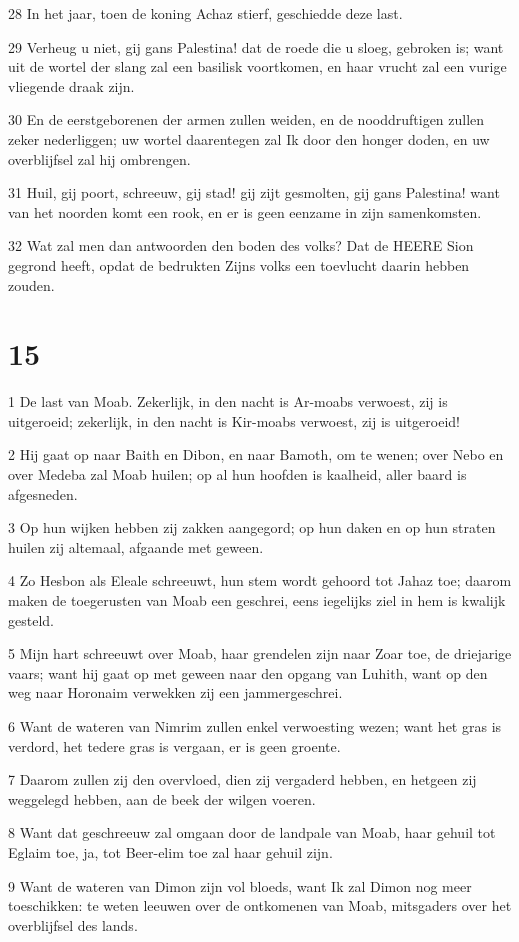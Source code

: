 \par 28 In het jaar, toen de koning Achaz stierf, geschiedde deze last.
\par 29 Verheug u niet, gij gans Palestina! dat de roede die u sloeg, gebroken is; want uit de wortel der slang zal een basilisk voortkomen, en haar vrucht zal een vurige vliegende draak zijn.
\par 30 En de eerstgeborenen der armen zullen weiden, en de nooddruftigen zullen zeker nederliggen; uw wortel daarentegen zal Ik door den honger doden, en uw overblijfsel zal hij ombrengen.
\par 31 Huil, gij poort, schreeuw, gij stad! gij zijt gesmolten, gij gans Palestina! want van het noorden komt een rook, en er is geen eenzame in zijn samenkomsten.
\par 32 Wat zal men dan antwoorden den boden des volks? Dat de HEERE Sion gegrond heeft, opdat de bedrukten Zijns volks een toevlucht daarin hebben zouden.

\chapter{15}

\par 1 De last van Moab. Zekerlijk, in den nacht is Ar-moabs verwoest, zij is uitgeroeid; zekerlijk, in den nacht is Kir-moabs verwoest, zij is uitgeroeid!
\par 2 Hij gaat op naar Baith en Dibon, en naar Bamoth, om te wenen; over Nebo en over Medeba zal Moab huilen; op al hun hoofden is kaalheid, aller baard is afgesneden.
\par 3 Op hun wijken hebben zij zakken aangegord; op hun daken en op hun straten huilen zij altemaal, afgaande met geween.
\par 4 Zo Hesbon als Eleale schreeuwt, hun stem wordt gehoord tot Jahaz toe; daarom maken de toegerusten van Moab een geschrei, eens iegelijks ziel in hem is kwalijk gesteld.
\par 5 Mijn hart schreeuwt over Moab, haar grendelen zijn naar Zoar toe, de driejarige vaars; want hij gaat op met geween naar den opgang van Luhith, want op den weg naar Horonaim verwekken zij een jammergeschrei.
\par 6 Want de wateren van Nimrim zullen enkel verwoesting wezen; want het gras is verdord, het tedere gras is vergaan, er is geen groente.
\par 7 Daarom zullen zij den overvloed, dien zij vergaderd hebben, en hetgeen zij weggelegd hebben, aan de beek der wilgen voeren.
\par 8 Want dat geschreeuw zal omgaan door de landpale van Moab, haar gehuil tot Eglaim toe, ja, tot Beer-elim toe zal haar gehuil zijn.
\par 9 Want de wateren van Dimon zijn vol bloeds, want Ik zal Dimon nog meer toeschikken: te weten leeuwen over de ontkomenen van Moab, mitsgaders over het overblijfsel des lands.

